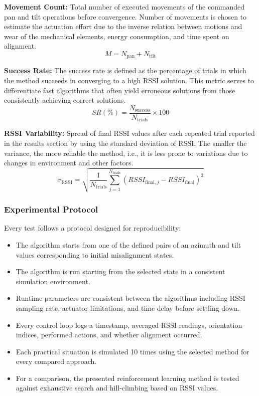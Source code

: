 \textbf{Movement Count:} 
Total number of executed movements of the commanded pan and tilt operations before convergence.
Number of movements is chosen to estimate the actuation effort due to the inverse relation between motions
and wear of the mechanical elements, energy consumption, and time spent on alignment.
\begin{equation}
M = N_{\text{pan}} + N_{\text{tilt}}
\end{equation}

\textbf{Success Rate:} 
The success rate is defined as the percentage of trials in which the method succeeds in converging
to a high RSSI solution. This metric serves to differentiate fast algorithms that often yield
erroneous solutions from those consistently achieving correct solutions.
\begin{equation}
SR(\%) = \frac{N_{\text{success}}}{N_{\text{trials}}} \times 100
\end{equation}

\textbf{RSSI Variability:} 
Spread of final RSSI values after each repeated trial reported in the results section by using
the standard deviation of RSSI. The smaller the variance, the more reliable the method,
i.e., it is less prone to variations due to changes in environment and other factors.
\begin{equation}
\sigma_{\text{RSSI}} = \sqrt{\frac{1}{N_{\text{trials}}}\sum_{j=1}^{N_{\text{trials}}}
\left(RSSI_{\text{final},j} - \overline{RSSI}_{\text{final}}\right)^2}
\end{equation}

\subsubsection{Experimental Protocol}

Every test follows a protocol designed for reproducibility:

\begin{itemize}
    \item The algorithm starts from one of the defined pairs of an azimuth and tilt 
    values corresponding to initial misalignment states.
    \item The algorithm is run starting from the selected state in a consistent 
    simulation environment.
    \item Runtime parameters are consistent between the algorithms including RSSI 
    sampling rate, actuator limitations, and time delay before settling down.
    \item Every control loop logs a timestamp, averaged RSSI readings, 
    orientation indices, performed actions, and whether alignment occurred.
    \item Each practical situation is simulated 10 times using the selected 
    method for every compared approach.
    \item For a comparison, the presented reinforcement learning method is tested against
    exhaustive search and hill-climbing based on RSSI values.
\end{itemize}


